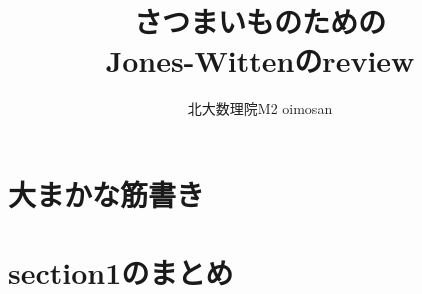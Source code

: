 \documentclass[11pt]{jsarticle}
\title{さつまいものための \\ Jones-Wittenのreview}
\author{北大数理院M2 oimosan}
\begin{document}
\maketitle

\section{大まかな筋書き}
\section{section1のまとめ}

\begin{thebibliography}{99}
\end{thebibliography}
\end{document}
